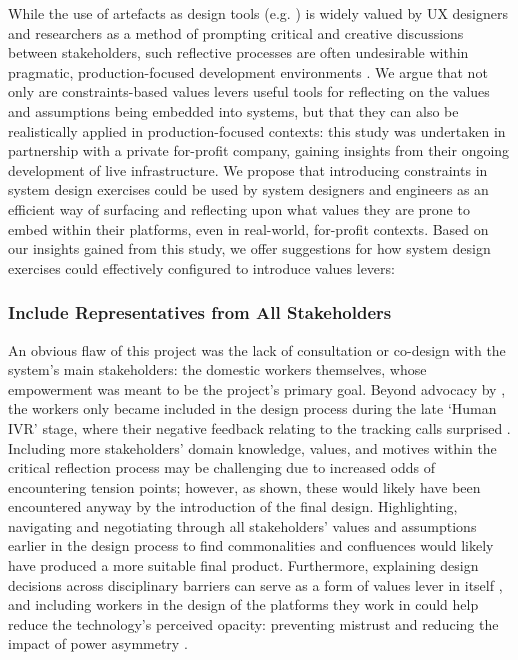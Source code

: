 While the use of artefacts as design tools (e.g. \cite{GrowAGame, Alshehri2020}) is widely valued by UX designers and researchers as a method of prompting critical and creative discussions between stakeholders, such reflective processes are often undesirable within pragmatic, production-focused development environments \cite{Shilton2013}. We argue that not only are constraints-based values levers useful tools for reflecting on the values and assumptions being embedded into systems, but that they can also be realistically applied in production-focused contexts: this study was undertaken in partnership with a private for-profit company, gaining insights from their ongoing development of live infrastructure. We propose that introducing constraints in system design exercises could be used by system designers and engineers as an efficient way of surfacing and reflecting upon what values they are prone to embed within their platforms, even in real-world, for-profit contexts. Based on our insights gained from this study, we offer suggestions for how system design exercises could effectively configured to introduce values levers:

\subsubsection{Include Representatives from All Stakeholders}

An obvious flaw of this project was the lack of consultation or co-design with the system's main stakeholders: the domestic workers themselves, whose empowerment was meant to be the project's primary goal. Beyond advocacy by \NGO{}, the workers only became included in the design process during the late `Human IVR' stage, where their negative feedback relating to the tracking calls surprised \PC{}. Including more stakeholders' domain knowledge, values, and motives within the critical reflection process may be challenging due to increased odds of encountering tension points; however, as shown, these would likely have been encountered anyway by the introduction of the final design. Highlighting, navigating and negotiating through all stakeholders' values and assumptions earlier in the design process to find commonalities and confluences would likely have produced a more suitable final product. Furthermore, explaining design decisions across disciplinary barriers can serve as a form of values lever in itself \cite{shilton2018}, and including workers in the design of the platforms they work in could help reduce the technology's perceived opacity: preventing mistrust and reducing the impact of power asymmetry \cite{lee2015, martin2016, carlos2021}.


